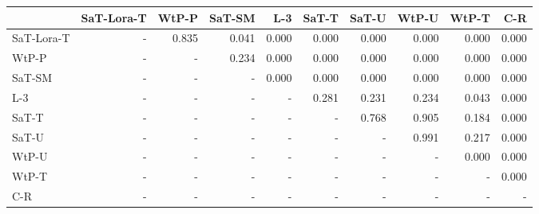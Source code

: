 \begin{tabular}{lrrrrrrrrr}
\toprule
 & SaT-Lora-T & WtP-P & SaT-SM & L-3 & SaT-T & SaT-U & WtP-U & WtP-T & C-R \\
\midrule
SaT-Lora-T & - & 0.835 & 0.041 & 0.000 & 0.000 & 0.000 & 0.000 & 0.000 & 0.000 \\
WtP-P & - & - & 0.234 & 0.000 & 0.000 & 0.000 & 0.000 & 0.000 & 0.000 \\
SaT-SM & - & - & - & 0.000 & 0.000 & 0.000 & 0.000 & 0.000 & 0.000 \\
L-3 & - & - & - & - & 0.281 & 0.231 & 0.234 & 0.043 & 0.000 \\
SaT-T & - & - & - & - & - & 0.768 & 0.905 & 0.184 & 0.000 \\
SaT-U & - & - & - & - & - & - & 0.991 & 0.217 & 0.000 \\
WtP-U & - & - & - & - & - & - & - & 0.000 & 0.000 \\
WtP-T & - & - & - & - & - & - & - & - & 0.000 \\
C-R & - & - & - & - & - & - & - & - & - \\
\bottomrule
\end{tabular}

